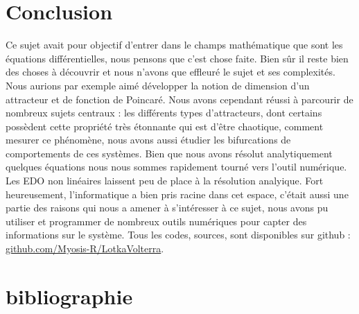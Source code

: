 \documentclass{wsdcr}
\begin{document}
\section{Conclusion}
Ce sujet avait pour objectif d'entrer dans le champs mathématique que sont les équations différentielles, nous pensons que c'est chose faite. Bien sûr il reste bien des choses à découvrir et nous n'avons que effleuré le sujet et ses complexités. Nous aurions par exemple aimé développer la notion de dimension d'un attracteur et de fonction de Poincaré. Nous avons cependant réussi à parcourir de nombreux sujets centraux : les différents types d'attracteurs, dont certains possèdent cette propriété très étonnante qui est d'être chaotique, comment mesurer ce phénomène, nous avons aussi étudier les bifurcations de comportements de ces systèmes. Bien que nous avons résolut analytiquement quelques équations nous nous sommes rapidement tourné vers l'outil numérique. Les EDO non linéaires laissent peu de place à la résolution analyique. Fort heureusement, l'informatique a bien pris racine dans cet espace, c'était aussi une partie des raisons qui nous a amener à s'intéresser à ce sujet, nous avons pu utiliser et programmer de nombreux outils numériques pour capter des informations sur le système. Tous les codes, sources, sont disponibles sur github : \url{github.com/Myosis-R/LotkaVolterra}.

\section{bibliographie}
\nocite{*}
\printbibliography



%
\end{document}
